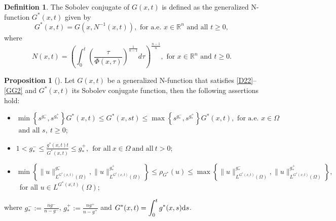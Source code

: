 \documentclass[10pt,reqno]{amsart}
\newcommand *\w{^\wedge}
\theoremstyle{definition}
\newtheorem{proposition}[theorem]{Proposition}
\newtheorem{definition}[theorem]{Definition}
\numberwithin{equation}{section}
\begin{document}
\begin{definition}
The Sobolev conjugate of $G(x,t)$ is defined as the generalized \textnormal{N}-function $G^\ast(x,t)$ given by
			\begin{equation*}
  G ^ \ast (x,t)=G (x, N^{-1} (x,t)) , \text{ for a.e. } x \in \mathbb{R}^n \text{ and all } t \geq 0,
\end{equation*}
where
\begin{equation*}
  N(x,t)= \left( \int_{0}^{t} \left( \frac{\tau}{\Phi (x, \tau)} \right)^{\frac{1}{n-1}} d \tau \right)^{\frac{n-1}{n}}, \text{ for } x \in \mathbb{R}^n \text{ and } t\geq 0.
\end{equation*}
 \end{definition}
 \begin{proposition}[\cite{Ala3}] \label{zoo*}
     Let $G(x,t)$ be a generalized \textnormal{N}-function that satisfies \eqref{D22}--\eqref{GG2} and $G^*(x,t)$ its Sobolev conjugate function, then the following assertions hold:
     \begin{itemize}
    \item [(1)] $\min \left\{s^{g^-_*}, s^{g^+_*}\right\}G^*(x,t)\leq  G^*(x,s t)\leq \max \left\{ s^{g^-_*}, s^{g^+_*}\right\}G^*(x,t),\text{ for a.e. } x \in \Omega$ $\text{ and all }  s, \ t \geq 0$;
 \item [(2)] $\displaystyle{
        1<g^-_*\leq \frac{g^*(x,t)t}{G^*(x,t)}\leq g^+_*,\ \ \text{for all}\ x\in \Omega\ \text{and all}\ t> 0}$;
    \item[(3)] $\min \left\{\|u\|_{L^{G^*(x,t)}(\Omega)}^{g^-_*},\|u\|_{L^{G^*(x,t)}(\Omega)}^{g^+_*}\right\} \leq \rho_{G^*}(u) \leq\max \left\{\|u\|_{L^{G^*(x,t)}(\Omega)}^{g^-_*},\|u\|_{L^{G^*(x,t)}(\Omega)}^{g^+_*}\right\},$ \ for all $  u\in L^{G^*(x,t)}(\Omega)$;
\end{itemize}
where $\displaystyle{g_*^- := \frac{ng^-}{n - g^-}}$, $\displaystyle{g_*^+ := \frac{ng^+}{n - g^+}}$ and $\displaystyle{G^*(x,t)=\int_0^t g^*(x,s){\rm d}s}$.
\end{proposition}
\end{document}
